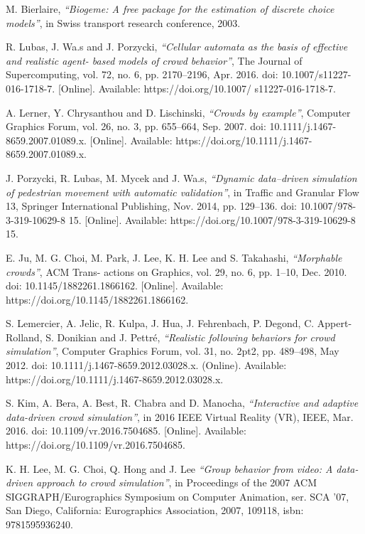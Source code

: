 \documentclass{standalone}
\begin{document}
\begin{thebibliography}{99}
M. Bierlaire,
  \textit{“Biogeme: A free package for the estimation of discrete choice models”}, 
in Swiss transport research conference, 
2003.

R. Lubas, J. Wa.s and J. Porzycki,
  \textit{“Cellular automata as the basis of effective and realistic agent- based models of crowd behavior”}, 
The Journal of Supercomputing, vol. 72, no. 6, pp. 2170–2196, 
Apr. 2016. 
doi: 10.1007/s11227-016-1718-7. 
[Online]. Available: https://doi.org/10.1007/ s11227-016-1718-7.

A. Lerner, Y. Chrysanthou and D. Lischinski, 
  \textit{“Crowds by example”}, 
  Computer Graphics Forum, vol. 26, no. 3, pp. 655–664, 
  Sep. 2007. 
  doi: 10.1111/j.1467-8659.2007.01089.x. 
  [Online]. Available: https://doi.org/10.1111/j.1467-8659.2007.01089.x.

J. Porzycki, R. Lubas, M. Mycek and J. Wa.s, 
  \textit{“Dynamic data–driven simulation of pedestrian movement with automatic validation”}, 
  in Traffic and Granular Flow 13, Springer International Publishing, 
  Nov. 2014, pp. 129–136. 
  doi: 10.1007/978-3-319-10629-8 15. 
  [Online]. Available: https://doi.org/10.1007/978-3-319-10629-8 15.

E. Ju, M. G. Choi, M. Park, J. Lee, K. H. Lee and S. Takahashi,
  \textit{“Morphable crowds”}, 
ACM Trans- actions on Graphics, vol. 29, no. 6, pp. 1–10, 
Dec. 2010. 
doi: 10.1145/1882261.1866162. 
[Online]. Available: https://doi.org/10.1145/1882261.1866162.

S. Lemercier, A. Jelic, R. Kulpa, J. Hua, J. Fehrenbach, P. Degond, C. Appert-Rolland, S. Donikian and J. Pettré,
  \textit{“Realistic following behaviors for crowd simulation”}, 
  Computer Graphics Forum, vol. 31, no. 2pt2, pp. 489–498, 
  May 2012. 
  doi: 10.1111/j.1467-8659.2012.03028.x. 
  (Online). Available: https://doi.org/10.1111/j.1467-8659.2012.03028.x.

S. Kim, A. Bera, A. Best, R. Chabra and D. Manocha,
  \textit{“Interactive and adaptive data-driven crowd simulation”}, 
  in 2016 IEEE Virtual Reality (VR), IEEE, 
  Mar. 2016. 
  doi: 10.1109/vr.2016.7504685. 
  [Online]. Available: https://doi.org/10.1109/vr.2016.7504685.
 
K. H. Lee, M. G. Choi, Q. Hong and J. Lee
  \textit{“Group behavior from video: A data-driven approach to crowd simulation”}, 
in Proceedings of the 2007 ACM SIGGRAPH/Eurographics Symposium on Computer Animation, 
ser. SCA ’07, San Diego, California: Eurographics Association, 2007, 109118, 
isbn: 9781595936240.


\end{thebibliography}
\end{document}
